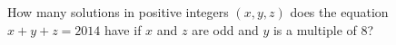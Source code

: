 How many solutions in positive integers $(x,y,z)$ does the equation $x+y+z=2014$ have if $x$ and $z$ are odd and $y$ is a multiple of $8$?
